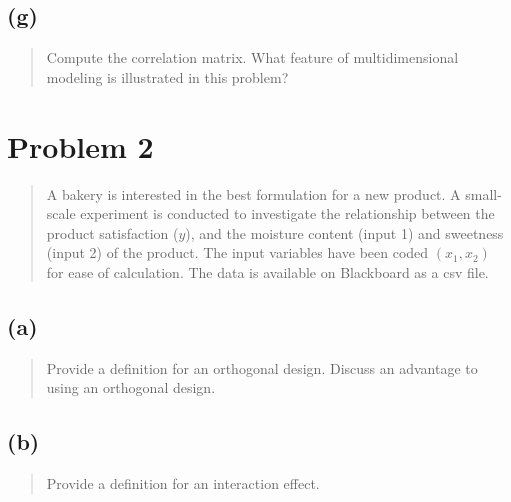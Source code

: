 \documentclass[
]{article}
\begin{document}
\hypertarget{g}{%
\subsection{(g)}\label{g}}

\begin{quote}
Compute the correlation matrix. What feature of multidimensional
modeling is illustrated in this problem?
\end{quote}

\vspace{50pt}

\hypertarget{problem-2}{%
\section{Problem 2}\label{problem-2}}

\begin{quote}
A bakery is interested in the best formulation for a new product. A
small-scale experiment is conducted to investigate the relationship
between the product satisfaction (\(y\)), and the moisture content
(input 1) and sweetness (input 2) of the product. The input variables
have been coded \((x_1,x_2)\) for ease of calculation. The data is
available on Blackboard as a csv file.
\end{quote}

\vspace{50pt}

\hypertarget{a-1}{%
\subsection{(a)}\label{a-1}}

\begin{quote}
Provide a definition for an orthogonal design. Discuss an advantage to
using an orthogonal design.
\end{quote}

\vspace{50pt}

\hypertarget{b-1}{%
\subsection{(b)}\label{b-1}}

\begin{quote}
Provide a definition for an interaction effect.
\end{quote}

\vspace{50pt}
\end{document}
